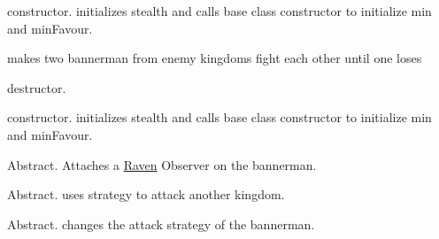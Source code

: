 
\begin{DoxyRefList}
\item[Member \mbox{\hyperlink{class_ambush_a31fe32d8eba8effd01382376f9aff1e0}{Ambush\+::Ambush}} (int stealth, int min, int min\+Favour)]\label{todo__todo000001}%
%
constructor. initializes stealth and calls base class constructor to initialize min and min\+Favour.  
\item[Member \mbox{\hyperlink{class_ambush_a51193e1b97edc379fb3c79918132ea15}{Ambush\+::attack}} (\mbox{\hyperlink{class_bannerman}{Bannerman}} $\ast$my\+Bannerman, \mbox{\hyperlink{class_bannerman}{Bannerman}} $\ast$enemy\+Bannerman)]\label{todo__todo000002}%
%
makes two bannerman from enemy kingdoms fight each other until one loses  
\item[Member \mbox{\hyperlink{class_ambush_a36a5798e6b3b4493e5e1c925d57d6a39}{Ambush\+::$\sim$\+Ambush}} ()]\label{todo__todo000003}%
%
destructor.  
\item[Member \mbox{\hyperlink{class_assassinate_ae4a924a40a5433112ff206bc3becff90}{Assassinate\+::Assassinate}} (int stealth, bool alive, int min, int min\+Favour)]\label{todo__todo000004}%
%
constructor. initializes stealth and calls base class constructor to initialize min and min\+Favour.  
\item[Member \mbox{\hyperlink{class_bannerman_a1bc3abe5d8a4c9dda697829eef3fc7c4}{Bannerman\+::attach}} (\mbox{\hyperlink{class_raven}{Raven}} $\ast$o)=0]\label{todo__todo000007}%
%
Abstract. Attaches a \mbox{\hyperlink{class_raven}{Raven}} Observer on the bannerman.  
\item[Member \mbox{\hyperlink{class_bannerman_a0acd7a49687131331f594cb590a31fc4}{Bannerman\+::attack}} (\mbox{\hyperlink{class_bannerman}{Bannerman}} $\ast$my\+Bannerman, \mbox{\hyperlink{class_bannerman}{Bannerman}} $\ast$enemy\+Bannerman)=0]\label{todo__todo000011}%
%
Abstract. uses strategy to attack another kingdom.  
\item[Member \mbox{\hyperlink{class_bannerman_a34f63b80fda395e2ae0e4c311056e364}{Bannerman\+::change\+Strategy}} (\mbox{\hyperlink{class_strategy}{Strategy}} $\ast$strategy)=0]\label{todo__todo000010}%
%
Abstract. changes the attack strategy of the bannerman.  
\item[Member \mbox{\hyperlink{class_bannerman_a1af377efb06af229f9a25141e9bcc6d4}{Bannerman\+::decrease\+Favour}} ()=0]\label{todo__todo000006}%

\end{DoxyRefList}
